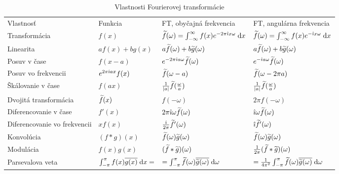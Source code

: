 \begin{table}[htp]
    \centering
    \begin{tabular}{llll}
    Vlastnosť&Funkcia&FT, obyčajná frekvencia&FT, angulárna
    frekvencia\\
    Transformácia&$f(x)$&
        $\widetilde{f}(\omega) = \int_{-\infty}^{\infty} f(x) e^{-2\pi\hat{\imath} x\omega} \; \mathrm{d} x$&
        $\widetilde{f}(\omega) = \int_{-\infty}^{\infty} f(x) e^{-\hat{\imath} x \omega} \; \mathrm{d} x$\\
    Linearita&$a f(x) + b g(x)$&
        $a \widetilde{f}(\omega) + b \widetilde{g}(\omega)$&
        $a \widetilde{f}(\omega) + b \widetilde{g}(\omega)$\\
    Posuv v čase&$f(x-a)$&
        $e^{-2\pi\hat{\imath} a \omega} \widetilde{f}(\omega)$&
        $e^{-\hat{\imath} a \omega} \widetilde{f}(\omega)$\\
    Posuv vo frekvencii&$ e^{2\pi\hat{\imath} a x} f(x)$&
        $\widetilde{f}(\omega-a)$&
        $\widetilde{f}(\omega-2\pi a)$\\
    Škálovanie v čase&$ f(a x)$&
        $\frac{1}{|a|}\widetilde{f}(\frac{\omega}{a})$&
        $\frac{1}{|a|}\widetilde{f}(\frac{\omega}{a})$\\
    Dvojitá transformácia&$ \widetilde{f}(x)$&
        $f(-\omega)$&
        $2\pi f(-\omega)$\\
    Diferencovanie v čase&$ f'(x)$&
        $2\pi\hat{\imath}\omega \widetilde{f}(\omega)$&
        $\hat{\imath}\omega \widetilde{f}(\omega)$\\
    Diferencovanie vo frekvencii&$x f(x)$&
        $\frac{\hat{\imath}}{2\pi} \widetilde{f}'(\omega)$&
        $\hat{\imath} \widetilde{f}'(\omega)$\\
    Konvolúcia&$ (f*g)(x)$&
        $\widetilde{f}(\omega) \widetilde{g}(\omega)$&
        $\widetilde{f}(\omega) \widetilde{g}(\omega)$\\
    Modulácia&$ f(x)g(x)$&
        $(\widetilde{f}*\widetilde{g})(\omega)$&
        $\frac{1}{2\pi}(\widetilde{f}*\widetilde{g})(\omega)$\\
    Parsevalova veta&
      $\int_{-\pi}^{\pi} f(x)\overline{g(x)} \; \mathrm{d} x=$&
      $=\int_{-\pi}^{\pi} \widetilde{f}(\omega) \overline{\widetilde{g}(\omega)} \; \mathrm{d}\omega$&
      $=\frac{1}{4\pi^2}\int_{-\pi}^{\pi} \widetilde{f}(\omega) \overline{\widetilde{g}(\omega)}
      \; \mathrm{d}\omega$\\
    \end{tabular}
    \caption{Vlastnosti Fourierovej transformácie}
    \label{tab:fourier_transform_vlastnosti}
\end{table}

